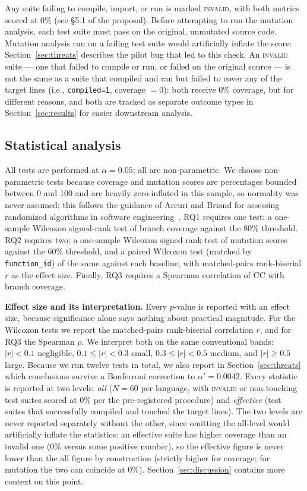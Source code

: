 Any suite failing to compile, import, or run is marked \textsc{invalid}, with both metrics
scored at 0\% (see \S5.1 of the proposal). Before attempting to run the mutation analysis,
each test suite must pass on the original, unmutated source code. Mutation analysis run on
a failing test suite would artificially inflate the score: Section~\ref{sec:threats}
describes the pilot bug that led to this check. An \textsc{invalid} suite --- one that
failed to compile or run, or failed on the original source --- is not the same as a suite
that compiled and ran but failed to cover any of the target lines (i.e.,
\texttt{compiled=1}, coverage $=0$): both receive 0\% coverage, but for different reasons,
and both are tracked as separate outcome types in Section~\ref{sec:results} for easier
downstream analysis.

\subsection{Statistical analysis}
All tests are performed at $\alpha = 0.05$; all are non-parametric. We choose non-parametric
tests because coverage and mutation scores are percentages bounded between 0 and 100 and are
heavily zero-inflated in this sample, so normality was never assumed; this follows the
guidance of Arcuri and Briand for assessing randomized algorithms in software
engineering~\cite{arcuri2014hitchhiker}. RQ1 requires one test: a one-sample Wilcoxon
signed-rank test of branch coverage against the 80\% threshold. RQ2 requires two: a
one-sample Wilcoxon signed-rank test of mutation scores against the 60\% threshold, and a
paired Wilcoxon test (matched by \texttt{function\_id}) of the same against each baseline,
with matched-pairs rank-biserial $r$ as the effect size. Finally, RQ3 requires a Spearman
correlation of CC with branch coverage.

\textbf{Effect size and its interpretation.} Every $p$-value is reported with an effect size,
because significance alone says nothing about practical magnitude. For the Wilcoxon tests we
report the matched-pairs rank-biserial correlation $r$, and for RQ3 the Spearman $\rho$. We
interpret both on the same conventional bands: $|r| < 0.1$ negligible, $0.1 \le |r| < 0.3$
small, $0.3 \le |r| < 0.5$ medium, and $|r| \ge 0.5$ large. Because we run twelve tests in
total, we also report in Section~\ref{sec:threats} which conclusions survive a Bonferroni
correction to $\alpha' = 0.0042$. Every statistic is reported at two levels: \emph{all} ($N = 60$ per
language, with \textsc{invalid} or non-touching test suites scored at 0\% per the
pre-registered procedure) and \emph{effective} (test suites that successfully compiled and
touched the target lines). The two levels are never reported separately without the other,
since omitting the all-level would artificially inflate the statistics: an effective suite
has higher coverage than an invalid one (0\% versus some positive number), so the
effective figure is never lower than the all figure by construction (strictly higher for
coverage; for mutation the two can coincide at 0\%).
Section~\ref{sec:discussion} contains more context on this point.
